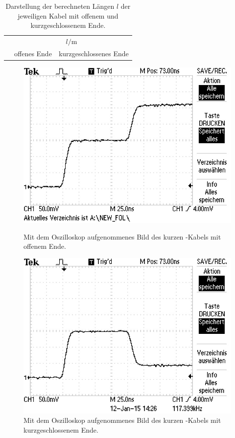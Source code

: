 \begin{table}[h]
  \centering
  \begin{tabular}{lcc}
    \midrule
    \midrule
    & \multicolumn{2}{c}{$l / \si{\meter}$} \\
    \cmidrule(lr{0.75em}){2-3}
    & offenes Ende & kurzgeschlossenes Ende \\
    \midrule
    
    \midrule
    \midrule
  \end{tabular}
  \caption{Darstellung der berechneten Längen $l$ der jeweiligen Kabel mit
    offenem und kurzgeschlossenem Ende.}
  \label{tab:Laengen}
\end{table}

\begin{figure}[ht]
  \centering
  \includegraphics[scale=0.5]{bilder/reflexion/F0000TEK.JPG}
  \caption{Mit dem Oszilloskop aufgenommenes Bild des kurzen \CU-Kabels mit
  offenem Ende.}
  \label{fig:oszi_50k_offen}
  \vspace{2em}
  \includegraphics[scale=0.5]{bilder/reflexion/F0001TEK.JPG}
  \caption{Mit dem Oszilloskop aufgenommenes Bild des kurzen \CU-Kabels mit
  kurzgeschlossenem Ende.}
  \label{fig:oszi_50k_kurz}
\end{figure}
